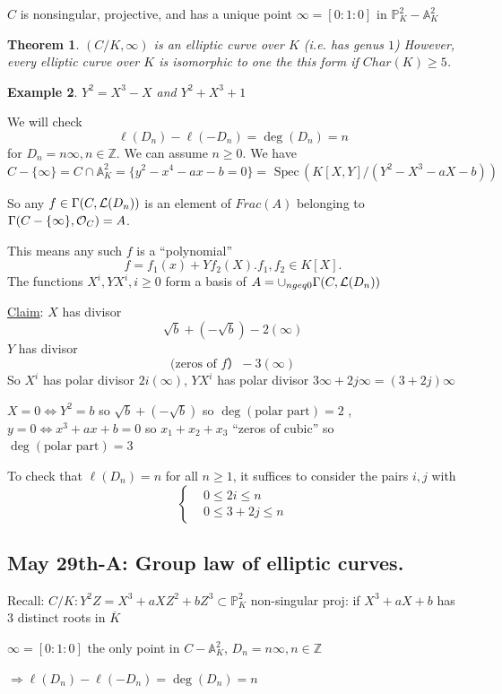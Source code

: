 \documentclass[11pt]{article}
\newtheorem{thm}{Theorem}[section]
\newtheorem{ex}[thm]{Example}
\newcommand{\spec}{\text{ Spec}\,}
\newcommand{\affn}{\mathbb A}
\newcommand{\proj}{\mathbb P}
\newcommand{\intg}{\mathbb Z}
\newcommand{\call}{{\cal L}}
\newcommand{\calo}{{\cal O}}
\newcommand{\Lrta}{\Longrightarrow}
\newcommand{\Llrta}{\Longleftrightarrow}
\begin{document}
$C$ is nonsingular, projective, and has a unique point $\infty=[0:1:0]$ in $\proj^2_K-\affn^2_K$

\begin{thm}$(C/K,\infty)$ is an elliptic curve over $K$ (i.e. has genus $1$) However, every elliptic curve over $K$ is isomorphic to one the this form if $Char(K)\geq 5$.
\end{thm}

\begin{ex}
$Y^2=X^3-X$ and $Y^2+X^3+1$
\end{ex}

We will check 
$$
\ell(D_n)-\ell(-D_n)=\deg(D_n)=n
$$
for $D_n=n\infty,n\in \intg$. We can assume $n\geq 0$. We have $C-\{\infty\}=C\cap \affn^2_K=\{y^2-x^4-ax-b=0\}=\spec(K[X,Y]/(Y^2-X^3-aX-b))$


So any  $f\in \Gamma(C,\call(D_n))$ is an element of $Frac(A)$ belonging to $\Gamma(C-\{\infty\},\calo_C)=A$.

This means any such $f$ is a ``polynomial'' 
$$
f=f_1(x)+Yf_2(X). f_1,f_2\in K[X].
$$
The functions $X^i, YX^i, i\geq 0 $ form a basis of  $A=\cup_{n geq 0}\Gamma(C,\call(D_n))$

\underline{Claim}: $X$ has divisor
$$
\sqrt{b}+(-\sqrt{b})-2(\infty)
$$
$Y$ has divisor
$$
(\text{zeros of  $f$}）-3(\infty)
$$
So $X^i$ has  polar divisor $2 i(\infty)$, $YX^i$ has polar divisor $3\infty+2j \infty=(3+2j)\infty$

$X=0\Llrta Y^2=b$ so $\sqrt{b}+(-\sqrt{b})$ so $\deg(\text{polar part})=2$
, $y=0\Llrta x^3+ax+b=0$ so $x_1+x_2+x_3$ ``zeros of cubic'' so $\deg(\text{polar part})=3$ 

To check that $\ell(D_n)=n$ for all $n\geq 1$, it suffices to consider the pairs $i,j$ with
$$
\left\{\begin{aligned}
& 0\leq 2i \leq n\\
& 0\leq 3+2j\leq n
\end{aligned}\right.
$$

\subsection{May 29th-A: Group law of elliptic curves.}
Recall:
$C/K:Y^2 Z=X^3+aXZ^2+bZ^3\subset \proj^2_K$
non-singular proj: if $X^3+aX+b$ has $3$ distinct roots in $\overline{K}$

$\infty=[0:1:0]$ the only point in $C-\affn^2_K$, $D_n=n\infty,n\in \intg$

$\Lrta \ell(D_n)-\ell(-D_n)=\deg(D_n)=n$
\end{document}

